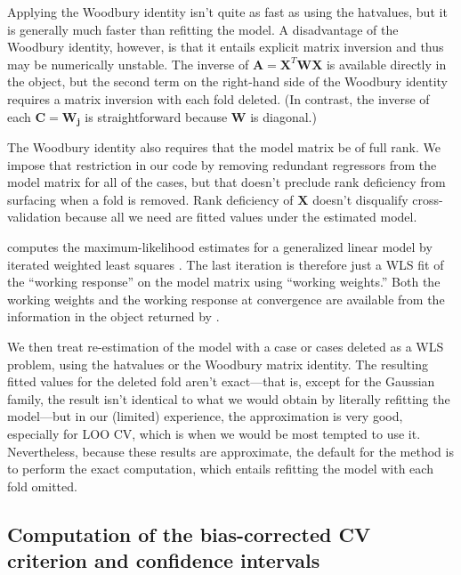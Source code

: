 \documentclass[
]{jss}
\begin{document}
Applying the Woodbury identity isn't quite as fast as using the
hatvalues, but it is generally much faster than refitting the model. A
disadvantage of the Woodbury identity, however, is that it entails
explicit matrix inversion and thus may be numerically unstable. The
inverse of \(\mathbf{A} = \mathbf{X}^T \mathbf{W} \mathbf{X}\) is
available directly in the  object, but the second term on the
right-hand side of the Woodbury identity requires a matrix inversion
with each fold deleted. (In contrast, the inverse of each
\(\mathbf{C} = \mathbf{W}_\mathbf{j}\) is straightforward because
\(\mathbf{W}\) is diagonal.)

The Woodbury identity also requires that the model matrix be of full
rank. We impose that restriction in our code by removing redundant
regressors from the model matrix for all of the cases, but that doesn't
preclude rank deficiency from surfacing when a fold is removed. Rank
deficiency of \(\mathbf{X}\) doesn't disqualify cross-validation because
all we need are fitted values under the estimated model.

 computes the maximum-likelihood estimates for a generalized
linear model by iterated weighted least squares \citep[see, e.g.,][Sec.
6.12]{FoxWeisberg:2019}. The last iteration is therefore just a WLS fit
of the ``working response'' on the model matrix using ``working
weights.'' Both the working weights and the working response at
convergence are available from the information in the object returned by
.

We then treat re-estimation of the model with a case or cases deleted as
a WLS problem, using the hatvalues or the Woodbury matrix identity. The
resulting fitted values for the deleted fold aren't exact---that is,
except for the Gaussian family, the result isn't identical to what we
would obtain by literally refitting the model---but in our (limited)
experience, the approximation is very good, especially for LOO CV, which
is when we would be most tempted to use it. Nevertheless, because these
results are approximate, the default for the  
method is to perform the exact computation, which entails refitting the
model with each fold omitted.

\hypertarget{computation-of-the-bias-corrected-cv-criterion-and-confidence-intervals}{%
\subsection{Computation of the bias-corrected CV criterion and
confidence
intervals}\label{computation-of-the-bias-corrected-cv-criterion-and-confidence-intervals}}
\end{document}
